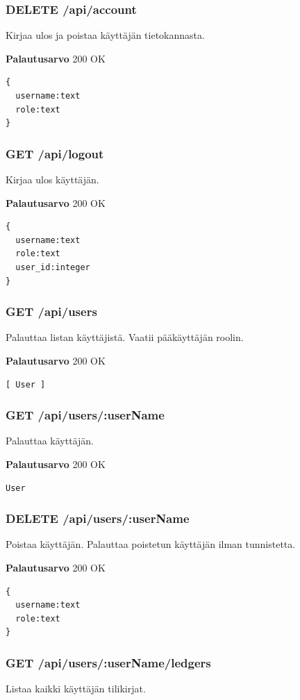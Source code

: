 \documentclass[a4paper,parskip=half]{scrartcl}
\begin{document}
\subsubsection{DELETE /api/account}
Kirjaa ulos ja poistaa käyttäjän tietokannasta.

\textbf{Palautusarvo}
200 OK
\begin{Verbatim}
{
  username:text
  role:text
}
\end{Verbatim}

\subsubsection{GET /api/logout}
Kirjaa ulos käyttäjän.

\textbf{Palautusarvo}
200 OK
\begin{Verbatim}
{
  username:text
  role:text
  user_id:integer
}
\end{Verbatim}

\subsubsection{GET /api/users}
Palauttaa listan käyttäjistä. Vaatii pääkäyttäjän roolin.

\textbf{Palautusarvo}
200 OK
\begin{Verbatim}
[ User ]
\end{Verbatim}

\subsubsection{GET /api/users/:userName}
Palauttaa käyttäjän.

\textbf{Palautusarvo}
200 OK
\begin{Verbatim}
User
\end{Verbatim}

\subsubsection{DELETE /api/users/:userName}
Poistaa käyttäjän. Palauttaa poistetun käyttäjän ilman tunnistetta.

\textbf{Palautusarvo}
200 OK
\begin{Verbatim}
{
  username:text
  role:text
}
\end{Verbatim}

\subsubsection{GET /api/users/:userName/ledgers}
Listaa kaikki käyttäjän tilikirjat.
\end{document}
